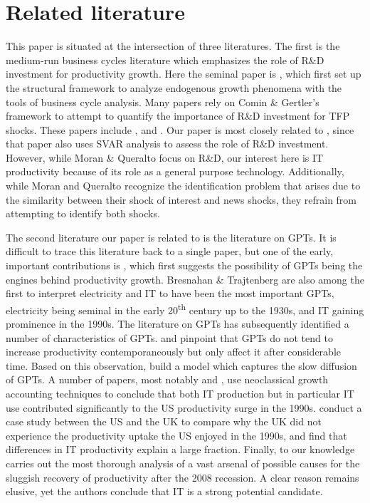 \documentclass[11pt]{article}
\renewcommand{\[}{\begin{equation}}
\renewcommand{\]}{\end{equation}}
\begin{document}
\section{Related literature}
\label{sec_related_lit}

This paper is situated at the intersection of three literatures. The first is the medium-run business cycles literature which emphasizes the role of R\&D investment for productivity growth. Here the seminal paper is \cite{comin_gertler2006}, which first set up the structural framework to analyze endogenous growth phenomena with the tools of business cycle analysis. Many papers rely on Comin \& Gertler's framework to attempt to quantify the importance of R\&D investment for TFP shocks. These papers include \cite{anzo_etal2016}, \cite{comin_etal2016} and \cite{moran_queralto2017}. Our paper is most closely related to \cite{moran_queralto2017}, since that paper also uses SVAR analysis to assess the role of R\&D investment. However, while Moran \& Queralto focus on R\&D, our interest here is IT productivity because of its role as a general purpose technology. Additionally, while Moran and Queralto recognize the identification problem that arises due to the similarity between their shock of interest and news shocks, they refrain from attempting to identify both shocks. 

The second literature our paper is related to is the literature on GPTs. It is difficult to trace this literature back to a single paper, but one of the early, important contributions is \cite{bresnahan_trajtenberg1992}, which first suggests the possibility of GPTs being the engines behind productivity growth. Bresnahan \& Trajtenberg are also among the first to interpret electricity and IT to have been the most important GPTs, electricity being seminal in the early 20\textsuperscript{th} century up to the 1930s, and IT gaining prominence in the 1990s. The literature on GPTs has subsequently identified a number of characteristics of GPTs. \cite{david1990} and \cite{jov_rous2005} pinpoint that GPTs do not tend to increase productivity contemporaneously but only affect it after considerable time. Based on this observation, \cite{atkeson_kehoe2007} build a model which captures the slow diffusion of GPTs. A number of papers, most notably \cite{oliner_sichel2000} and \cite{oulton2010}, use neoclassical growth accounting techniques to conclude that both IT production but in particular IT use contributed significantly to the US productivity surge in the 1990s. \cite{basu_etal2004} conduct a case study between the US and the UK to compare why the UK did not experience the productivity uptake the US enjoyed in the 1990s, and find that differences in IT productivity explain a large fraction. Finally, to our knowledge \cite{allstar_paper} carries out the most thorough analysis of a vast arsenal of possible causes for the sluggish recovery of productivity after the 2008 recession. A clear reason remains elusive, yet the authors conclude that IT is a strong potential candidate. 
\end{document}
